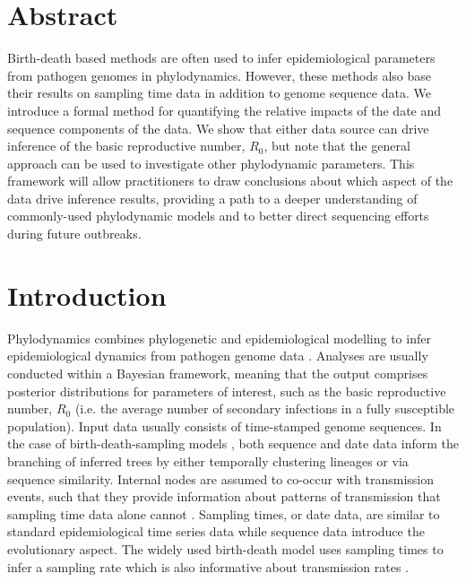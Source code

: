\documentclass{article}
\newcommand{\ignore}[1]{}
\begin{document}
\section*{Abstract}
Birth-death based methods are often used to infer epidemiological parameters from pathogen genomes in phylodynamics.
However, these methods also base their results on sampling time data in addition to genome sequence data.
We introduce a formal method for quantifying the relative impacts of the date and sequence components of the data.
We show that either data source can drive inference of the basic reproductive number, $R_0$, but note that the general approach can be used to investigate other phylodynamic parameters. This framework will allow practitioners to draw conclusions about which aspect of the data drive inference results, providing a path to a deeper understanding of commonly-used phylodynamic models and to better direct sequencing efforts during future outbreaks.
\section*{Introduction}
Phylodynamics combines phylogenetic and epidemiological modelling to infer epidemiological dynamics from pathogen genome data \citep{du2015getting,baele2018recent,volz2013viral}. Analyses are usually conducted within a Bayesian framework, meaning that the output comprises posterior distributions for parameters of interest, such as the basic reproductive number, $R_{0}$ (i.e. the average number of secondary infections in a fully susceptible population). Input data usually consists of time-stamped genome sequences. In the case of birth-death-sampling models \citep{stadler_sampling-through-time_2010}, both sequence and date data inform the branching of inferred trees by either temporally clustering lineages or via sequence similarity.  Internal nodes are assumed to co-occur with transmission events, such that they provide information about patterns of transmission that sampling time data alone cannot \ignore{cite review when out}. Sampling times, or date data, are similar to standard epidemiological time series data while sequence data introduce the evolutionary aspect. The widely used birth-death model uses sampling times to infer a sampling rate which is also informative about transmission rates \citep{boskova2018influence,stadler2012estimating}. 
\end{document}
